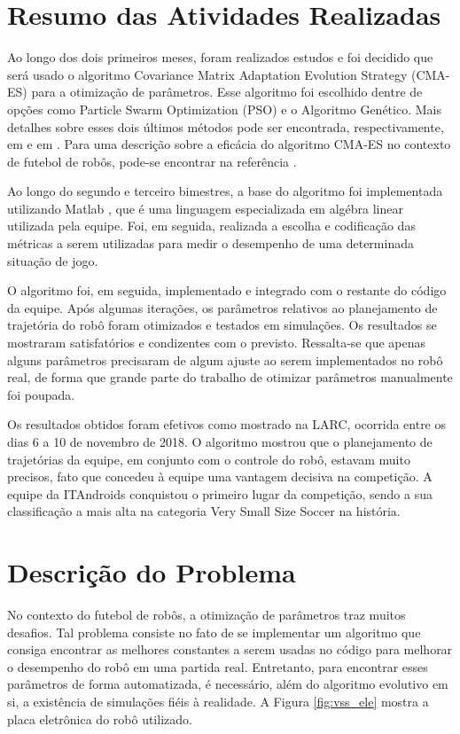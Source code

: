 \documentclass[a4paper,12pt]{article}
\begin{document}
\section{Resumo das Atividades Realizadas}
\label{secao:atividades_realizadas}

Ao longo dos dois primeiros meses, foram realizados estudos e foi decidido que será usado o algoritmo Covariance Matrix Adaptation Evolution Strategy (CMA-ES) para a otimização de parâmetros. Esse algoritmo foi escolhido dentre de opções como Particle Swarm Optimization (PSO) e o Algoritmo Genético. Mais detalhes sobre esses dois últimos métodos pode ser encontrada, respectivamente, em \cite{PSO} e em \cite{genetico}. Para uma descrição sobre a eficácia do algoritmo CMA-ES no contexto de futebol de robôs, pode-se encontrar na referência \cite{CMA-ES-Soccer}.

Ao longo do segundo e terceiro bimestres, a base do algoritmo foi implementada utilizando Matlab \cite{matlab}, que é uma linguagem especializada em algébra linear utilizada pela equipe. Foi, em seguida, realizada a escolha e codificação das métricas a serem utilizadas para medir o desempenho de uma determinada situação de jogo.

O algoritmo foi, em seguida, implementado e integrado com o restante do código da equipe. Após algumas iterações, os parâmetros relativos ao planejamento de trajetória do robô foram otimizados e testados em simulações. Os resultados se mostraram satisfatórios e condizentes com o previsto. Ressalta-se que apenas alguns parâmetros precisaram de algum ajuste ao serem implementados no robô real, de forma que grande parte do trabalho de otimizar parâmetros manualmente foi poupada.

Os resultados obtidos foram efetivos como mostrado na LARC, ocorrida entre os dias 6 a 10 de novembro de 2018. O algoritmo mostrou que o planejamento de trajetórias da equipe, em conjunto com o controle do robô, estavam muito precisos, fato que concedeu à equipe uma vantagem decisiva na competição. A equipe da ITAndroids conquistou o primeiro lugar da competição, sendo a sua classificação a mais alta  na categoria Very Small Size Soccer na história.
\section{Descrição do Problema}
\label{secao:enunciado_problema}

No contexto do futebol de robôs, a otimização de parâmetros traz muitos desafios. Tal problema consiste no fato de se implementar um algoritmo que consiga encontrar as melhores constantes a serem usadas no código para melhorar o desempenho do robô em uma partida real. Entretanto, para encontrar esses parâmetros de forma automatizada, é necessário, além do algoritmo evolutivo em si, a existência de simulações fiéis à realidade. A Figura \ref{fig:vss_ele} mostra a placa eletrônica do robô utilizado.
\end{document}
